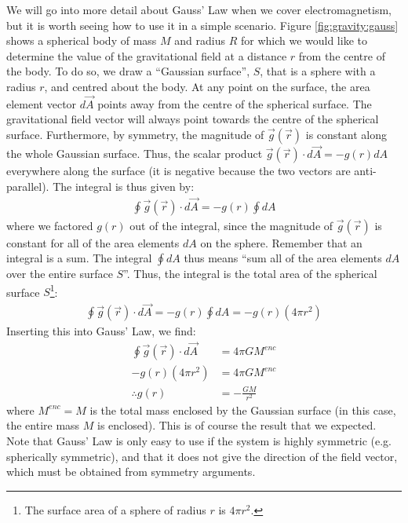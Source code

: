 We will go into more detail about Gauss' Law when we cover electromagnetism, but it is worth seeing how to use it in a simple scenario. Figure \ref{fig:gravity:gauss} shows a spherical body of mass $M$ and radius $R$ for which we would like to determine the value of the gravitational field at a distance $r$ from the centre of the body.
To do so, we draw a ``Gaussian surface'', $S$, that is a sphere with a radius $r$, and centred about the body. At any point on the surface, the area element vector $d\vec A$ points away from the centre of the spherical surface. The gravitational field vector will always point towards the centre of the spherical surface. Furthermore, by symmetry, the magnitude of $\vec g(\vec r)$ is constant along the whole Gaussian surface. Thus, the scalar product $\vec g(\vec r) \cdot d\vec A=-g(r)dA$ everywhere along the surface (it is negative because the two vectors are anti-parallel). The integral is thus given by:
\begin{align*}
\oint \vec g(\vec r) \cdot d\vec A = -g(r)\oint dA 
\end{align*}
where we factored $g(r)$ out of the integral, since the magnitude of $\vec g(\vec r)$ is constant for all of the area elements $dA$ on the sphere. Remember that an integral is a sum. The integral $\oint dA$ thus means ``sum all of the area elements $dA$ over the entire surface $S$''. Thus, the integral is the total area of the spherical surface $S$\footnote{The surface area of a sphere of radius $r$ is $4\pi r^2$.}:
\begin{align*}
\oint \vec g(\vec r) \cdot d\vec A = -g(r)\oint dA =-g(r)(4\pi r^2)
\end{align*}
Inserting this into Gauss' Law, we find:
\begin{align*}
\oint \vec g(\vec r) \cdot d\vec A &= 4\pi G M^{enc}\\
-g(r)(4\pi r^2) &= 4\pi G M^{enc}\\
\therefore g(r) &= - \frac{GM}{r^2}
\end{align*}
where $M^{enc}=M$ is the total mass enclosed by the Gaussian surface (in this case, the entire mass $M$ is enclosed). This is of course the result that we expected. Note that Gauss' Law is only easy to use if the system is highly symmetric (e.g. spherically symmetric), and that it does not give the direction of the field vector, which must be obtained from symmetry arguments. 

